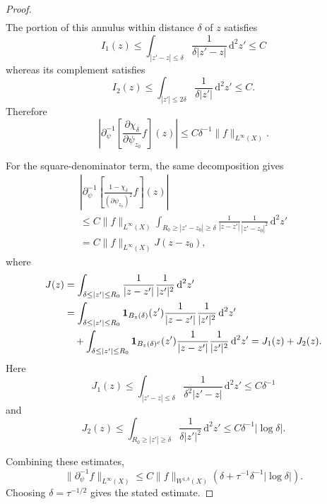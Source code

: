 \documentclass[10pt,a4paper]{amsart}
\newcommand{\dd}{\,\text{d}}
\newcommand{\pr}{\partial}
\newcommand{\psiz}{\psi_{z_0}}
\theoremstyle{plain}
\theoremstyle{definition}
\theoremstyle{remark}
\begin{document}
\begin{proof}
\begin{align}
\end{align}
The portion of this annulus within distance $\delta$ of $z$ satisfies
\begin{equation}
I_1(z)\leq\int_{|z'-z|\leq \delta}\frac{1}{\delta|z'-z|}\dd^2 z'\leq C
\end{equation}
whereas its complement satisfies
\begin{equation}
I_2(z)\leq \int_{|z'|\leq2\delta}\frac{1}{\delta|z'|}\dd^2 z'\leq C.
\end{equation}
Therefore
\begin{equation}
\left|\pr_\psi^{-1}\left[\frac{\pr \chi_\delta}{\pr\psiz} f  \right](z)\right|\leq C\delta^{-1}\|f\|_{L^\infty(X)}.
\end{equation}


For the square-denominator term, the same decomposition gives
\begin{multline}
\left|\pr_\psi^{-1}\left[\frac{1- \chi_\delta}{(\pr\psiz)^2} f  \right](z)\right|\\[5pt]
\leq C\|f\|_{L^\infty(X)}\int_{R_0\geq|z'-z_0|\geq\delta}\frac{1}{|z-z'|}\frac{1}{|z'-z_0|^2}\dd^2z'\\[5pt]
=C\|f\|_{L^\infty(X)}J(z-z_0),
\end{multline}
where 
\begin{align}
J(z)
&=\int_{\delta\leq|z'|\leq R_0}\frac{1}{|z-z'|}\frac{1}{|z'|^{2}}\dd^2z' \notag\\
&=\int_{\delta\leq|z'|\leq R_0}\mathbf{1}_{B_{z}(\delta)}(z')\frac{1}{|z-z'|}\frac{1}{|z'|^{2}}\dd^2z' \notag\\
&\quad +\int_{\delta\leq|z'|\leq R_0}\mathbf{1}_{B_{z}(\delta)^c}(z')\frac{1}{|z-z'|}\frac{1}{|z'|^{2}}\dd^2z'
=J_1(z)+J_2(z).
\end{align}
Here
\begin{equation}
J_1(z)\leq\int_{|z'-z|\leq \delta}\frac{1}{\delta^2|z'-z|}\dd^2 z'\leq C\delta^{-1}
\end{equation}
and
\begin{equation}
J_2(z)\leq \int_{R_0\geq|z'|\geq\delta}\frac{1}{\delta|z'|^2}\dd^2 z'\leq C\delta^{-1}|\log\delta|.
\end{equation}


Combining these estimates,
\begin{equation}
\|\pr_\psi^{-1}f\|_{L^\infty(X)}\leq C\|f\|_{W^{1,b}(X)}\left(\delta+\tau^{-1}\delta^{-1} |\log\delta| \right).
\end{equation}
Choosing $\delta=\tau^{-1/2}$ gives the stated estimate.
\end{proof}
\end{document}
